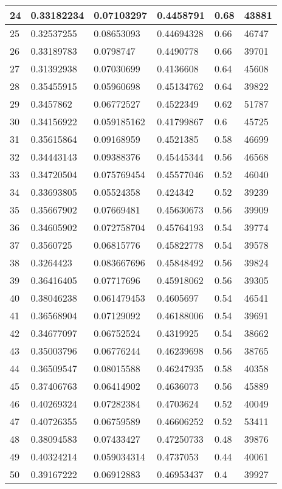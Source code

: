 \begin{longtable}{|l|l|l|l|l|l|}
24 & 0.33182234 & 0.07103297 & 0.4458791 & 0.68 & 43881 \\ \hline 
25 & 0.32537255 & 0.08653093 & 0.44694328 & 0.66 & 46747 \\ \hline 
26 & 0.33189783 & 0.0798747 & 0.4490778 & 0.66 & 39701 \\ \hline 
27 & 0.31392938 & 0.07030699 & 0.4136608 & 0.64 & 45608 \\ \hline 
28 & 0.35455915 & 0.05960698 & 0.45134762 & 0.64 & 39822 \\ \hline 
29 & 0.3457862 & 0.06772527 & 0.4522349 & 0.62 & 51787 \\ \hline 
30 & 0.34156922 & 0.059185162 & 0.41799867 & 0.6 & 45725 \\ \hline 
31 & 0.35615864 & 0.09168959 & 0.4521385 & 0.58 & 46699 \\ \hline 
32 & 0.34443143 & 0.09388376 & 0.45445344 & 0.56 & 46568 \\ \hline 
33 & 0.34720504 & 0.075769454 & 0.45577046 & 0.52 & 46040 \\ \hline 
34 & 0.33693805 & 0.05524358 & 0.424342 & 0.52 & 39239 \\ \hline 
35 & 0.35667902 & 0.07669481 & 0.45630673 & 0.56 & 39909 \\ \hline 
36 & 0.34605902 & 0.072758704 & 0.45764193 & 0.54 & 39774 \\ \hline 
37 & 0.3560725 & 0.06815776 & 0.45822778 & 0.54 & 39578 \\ \hline 
38 & 0.3264423 & 0.083667696 & 0.45848492 & 0.56 & 39824 \\ \hline 
39 & 0.36416405 & 0.07717696 & 0.45918062 & 0.56 & 39305 \\ \hline 
40 & 0.38046238 & 0.061479453 & 0.4605697 & 0.54 & 46541 \\ \hline 
41 & 0.36568904 & 0.07129092 & 0.46188006 & 0.54 & 39691 \\ \hline 
42 & 0.34677097 & 0.06752524 & 0.4319925 & 0.54 & 38662 \\ \hline 
43 & 0.35003796 & 0.06776244 & 0.46239698 & 0.56 & 38765 \\ \hline 
44 & 0.36509547 & 0.08015588 & 0.46247935 & 0.58 & 40358 \\ \hline 
45 & 0.37406763 & 0.06414902 & 0.4636073 & 0.56 & 45889 \\ \hline 
46 & 0.40269324 & 0.07282384 & 0.4703624 & 0.52 & 40049 \\ \hline 
47 & 0.40726355 & 0.06759589 & 0.46606252 & 0.52 & 53411 \\ \hline 
48 & 0.38094583 & 0.07433427 & 0.47250733 & 0.48 & 39876 \\ \hline 
49 & 0.40324214 & 0.059034314 & 0.4737053 & 0.44 & 40061 \\ \hline 
50 & 0.39167222 & 0.06912883 & 0.46953437 & 0.4 & 39927 \\ \hline 
\end{longtable}